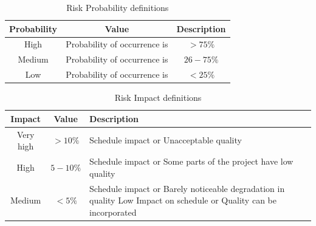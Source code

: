 \documentclass[oneside,a4paper,12pt]{report}
\begin{document}
\begin{table}[!htbp]
\begin{center}
\def\arraystretch{1.5}
\begin{tabular}{| c | c | c |}
\hline
Probability & Value &	Description \\ \hline
High &	Probability of occurrence is &  $ > 75 \% $ \\ \hline
Medium &	Probability of occurrence is  & $26-75 \% $ \\ \hline
Low	& Probability of occurrence is & $ < 25 \% $ \\ \hline
\end{tabular}
\end{center}
\caption{Risk Probability definitions \citep{bookPressman}}
\label{tab:riskdef}
\end{table}

\begin{table}[!htbp]
\begin{center}
\def\arraystretch{1.5}
\begin{tabularx}{\textwidth}{| c | c | X |}
\hline
Impact & Value	& Description \\ \hline
Very high &	$> 10 \%$ & Schedule impact or Unacceptable quality \\ \hline
High &	$5-10 \%$ & Schedule impact or Some parts of the project have low quality \\ \hline
Medium	& $ < 5 \% $ & Schedule impact or Barely noticeable degradation in quality Low	Impact on schedule or Quality can be incorporated \\ \hline
\end{tabularx}
\end{center}
\caption{Risk Impact definitions \citep{bookPressman}}
\label{tab:riskImpactDef}
\end{table}
\end{document}
